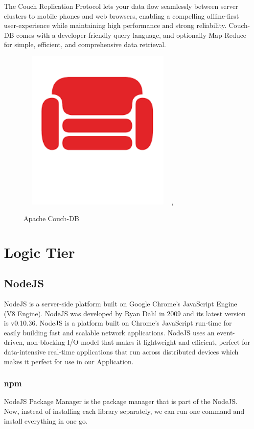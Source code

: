 \documentclass[12pt,a4paper,oneside,openany]{book}
\begin{document}
The Couch Replication Protocol lets your data flow seamlessly between server clusters to mobile phones and web browsers, enabling a compelling offline-first user-experience while maintaining high performance and strong reliability. Couch-DB comes with a developer-friendly query language, and optionally Map-Reduce for simple, efficient, and comprehensive data retrieval. \cite{ApacheCouchDB}

\begin{figure}[ht]
\renewcommand\thefigure{4.2}
\centering
\includegraphics[width=8cm, height=8cm]{Images/couch.png},
\caption{Apache Couch-DB}
\label{couch}
\end{figure} 

\section{Logic Tier}

\subsection{NodeJS}
NodeJS is a server-side platform built on Google Chrome's JavaScript Engine (V8 Engine). NodeJS was developed by Ryan Dahl in 2009 and its latest version is v0.10.36. NodeJS is a platform built on Chrome's JavaScript run-time for easily building fast and scalable network applications. NodeJS uses an event-driven, non-blocking I/O model that makes it lightweight and efficient, perfect for data-intensive real-time applications that run across distributed devices which makes it perfect for use in our Application. \cite{NodeJS}

\subsubsection{npm}
NodeJS Package Manager is the package manager that is part of the NodeJS.
Now, instead of installing each library separately, we can run one command and install everything in one go.
\end{document}
